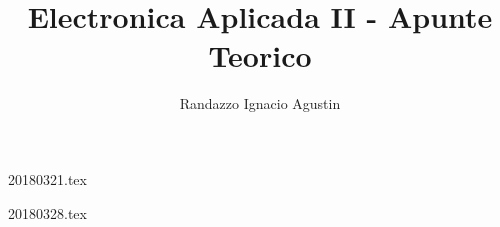 

\title{Electronica Aplicada II - Apunte Teorico}
\author{Randazzo Ignacio Agustin}


\maketitle
\tableofcontents

{20180321.tex}

{20180328.tex}



